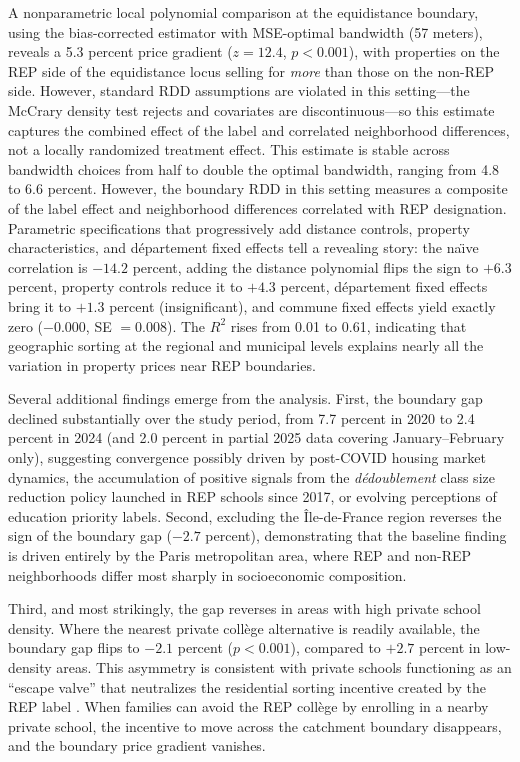 \documentclass[12pt]{article}
\begin{document}
A nonparametric local polynomial comparison at the equidistance boundary, using the \citet{calonico2014} bias-corrected estimator with MSE-optimal bandwidth (57 meters), reveals a 5.3 percent price gradient ($z = 12.4$, $p < 0.001$), with properties on the REP side of the equidistance locus selling for \textit{more} than those on the non-REP side. However, standard RDD assumptions are violated in this setting---the McCrary density test rejects and covariates are discontinuous---so this estimate captures the combined effect of the label and correlated neighborhood differences, not a locally randomized treatment effect. This estimate is stable across bandwidth choices from half to double the optimal bandwidth, ranging from 4.8 to 6.6 percent. However, the boundary RDD in this setting measures a composite of the label effect and neighborhood differences correlated with REP designation. Parametric specifications that progressively add distance controls, property characteristics, and d\'{e}partement fixed effects tell a revealing story: the na\"{\i}ve correlation is $-14.2$ percent, adding the distance polynomial flips the sign to $+6.3$ percent, property controls reduce it to $+4.3$ percent, d\'{e}partement fixed effects bring it to $+1.3$ percent (insignificant), and commune fixed effects yield exactly zero ($-0.000$, SE $= 0.008$). The $R^2$ rises from 0.01 to 0.61, indicating that geographic sorting at the regional and municipal levels explains nearly all the variation in property prices near REP boundaries.

Several additional findings emerge from the analysis. First, the boundary gap declined substantially over the study period, from 7.7 percent in 2020 to 2.4 percent in 2024 (and 2.0 percent in partial 2025 data covering January--February only), suggesting convergence possibly driven by post-COVID housing market dynamics, the accumulation of positive signals from the \textit{d\'{e}doublement} class size reduction policy launched in REP schools since 2017, or evolving perceptions of education priority labels. Second, excluding the \^{I}le-de-France region reverses the sign of the boundary gap ($-2.7$ percent), demonstrating that the baseline finding is driven entirely by the Paris metropolitan area, where REP and non-REP neighborhoods differ most sharply in socioeconomic composition.

Third, and most strikingly, the gap reverses in areas with high private school density. Where the nearest private coll\`{e}ge alternative is readily available, the boundary gap flips to $-2.1$ percent ($p < 0.001$), compared to $+2.7$ percent in low-density areas. This asymmetry is consistent with private schools functioning as an ``escape valve'' that neutralizes the residential sorting incentive created by the REP label \citep{hoxby2000, nechyba2006}. When families can avoid the REP coll\`{e}ge by enrolling in a nearby private school, the incentive to move across the catchment boundary disappears, and the boundary price gradient vanishes.
\end{document}
